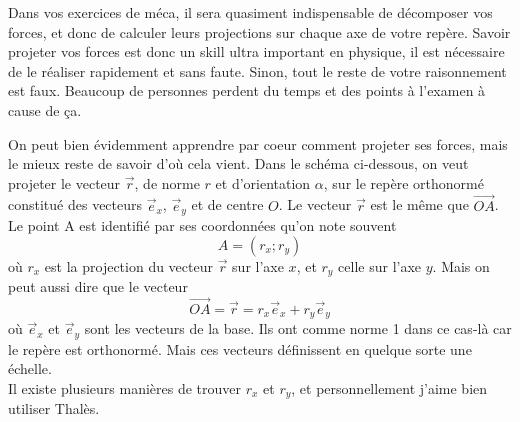 \documentclass{article}
\begin{document}
Dans vos exercices de méca, il sera quasiment  indispensable de décomposer vos forces, et donc de calculer leurs projections sur chaque axe de votre repère.
Savoir projeter vos forces est donc un skill ultra important en physique, il est nécessaire de le réaliser rapidement et sans faute. Sinon, tout le reste de votre raisonnement est faux. Beaucoup de personnes perdent du temps et des points à l'examen à cause de ça.


On peut bien évidemment apprendre par coeur comment projeter ses forces, mais le mieux reste de savoir d'où cela vient. 
Dans le schéma ci-dessous, on veut projeter le vecteur $\vec{r}$, de norme $r$ et d'orientation $\alpha$, sur le repère orthonormé constitué des vecteurs $\vec{e}_x$, $\vec{e}_y$ et de centre $O$. Le vecteur $\vec{r}$ est le même que $\overrightarrow{OA}$. Le point A est identifié par ses coordonnées qu'on note souvent \[A=(r_x; r_y)\]
 où $r_x$ est la projection du vecteur $\vec{r}$ sur l'axe $x$, et $r_y$ celle sur l'axe $y$. Mais on peut aussi dire que le vecteur \[\overrightarrow{OA}=\vec{r}=r_x \vec{e}_x+r_y \vec{e}_y\]
où $\vec{e}_x$ et $\vec{e}_y$ sont les vecteurs de la base. Ils ont comme norme 1 dans ce cas-là car le repère est orthonormé. Mais ces vecteurs définissent en quelque sorte une échelle. \\
Il existe plusieurs manières de trouver $r_x$ et $r_y$, et personnellement j'aime bien utiliser Thalès.
\end{document}
